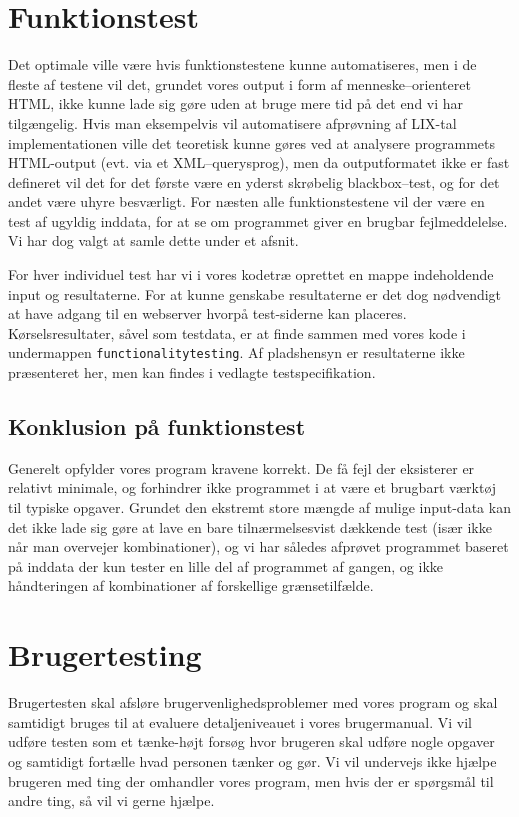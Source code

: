 \documentclass[a4paper,oneside]{memoir}
\begin{document}
\section{Funktionstest}

Det optimale ville være hvis funktionstestene kunne automatiseres, men
i de fleste af testene vil det, grundet vores output i form af
menneske--orienteret HTML, ikke kunne lade sig gøre uden at bruge mere
tid på det end vi har tilgængelig. Hvis man eksempelvis vil
automatisere afprøvning af LIX-tal implementationen ville det
teoretisk kunne gøres ved at analysere programmets HTML-output
(evt. via et XML--querysprog), men da outputformatet ikke er fast
defineret vil det for det første være en yderst skrøbelig
blackbox--test, og for det andet være uhyre besværligt. For næsten
alle funktionstestene vil der være en test af ugyldig inddata, for at
se om programmet giver en brugbar fejlmeddelelse. Vi har dog valgt at
samle dette under et afsnit.

For hver individuel test har vi i vores kodetræ oprettet en mappe
indeholdende input og resultaterne. For at kunne genskabe resultaterne
er det dog nødvendigt at have adgang til en webserver hvorpå
test-siderne kan placeres. Kørselsresultater, såvel som testdata, er
at finde sammen med vores kode i undermappen
\texttt{functionalitytesting}. Af pladshensyn er resultaterne ikke
præsenteret her, men kan findes i vedlagte testspecifikation.

\subsection{Konklusion på funktionstest}

Generelt opfylder vores program kravene korrekt. De få fejl der
eksisterer er relativt minimale, og forhindrer ikke programmet i at
være et brugbart værktøj til typiske opgaver. Grundet den ekstremt
store mængde af mulige input-data kan det ikke lade sig gøre at lave
en bare tilnærmelsesvist dækkende test (især ikke når man overvejer
kombinationer), og vi har således afprøvet programmet baseret på
inddata der kun tester en lille del af programmet af gangen, og ikke
håndteringen af kombinationer af forskellige grænsetilfælde.

\section{Brugertesting}
\label{brugertesting}
Brugertesten skal afsløre brugervenlighedsproblemer med vores program
og skal samtidigt bruges til at evaluere detaljeniveauet i vores
brugermanual. Vi vil udføre testen som et tænke-højt forsøg hvor
brugeren skal udføre nogle opgaver og samtidigt fortælle hvad personen
tænker og gør. Vi vil undervejs ikke hjælpe brugeren med ting der
omhandler vores program, men hvis der er spørgsmål til andre ting, så
vil vi gerne hjælpe.
\end{document}

